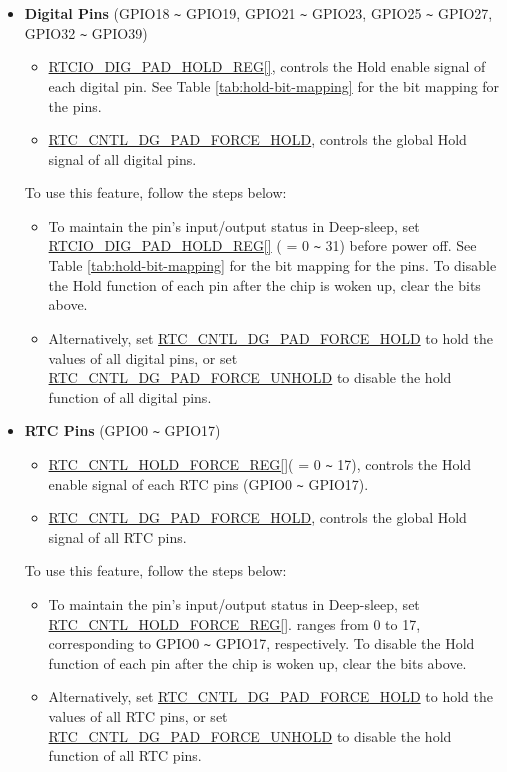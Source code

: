 \documentclass[main\_\_EN.tex]{subfiles}
\begin{document}
\begin{itemize}
    \item \textbf{Digital Pins} (GPIO18 \verb+~+ GPIO19, GPIO21 \verb+~+ GPIO23, GPIO25 \verb+~+ GPIO27, GPIO32 \verb+~+ GPIO39)
    \begin{itemize}
        \item \hyperref[regdesc:RTCIODIGPADHOLDREG] {RTCIO\_DIG\_PAD\_HOLD\_REG[]}, controls the Hold enable signal of each digital pin. See Table \ref{tab:hold-bit-mapping} for the bit mapping for the pins.
        \item \hyperref[regdesc:RTCCNTLDIGISOREG]{RTC\_CNTL\_DG\_PAD\_FORCE\_HOLD}, controls the global Hold signal of all digital pins.
    \end{itemize}
To use this feature, follow the steps below:
    \begin{itemize}
        \item To maintain the pin's input/output status in Deep-sleep, set \hyperref[regdesc:RTCIODIGPADHOLDREG] {RTCIO\_DIG\_PAD\_HOLD\_REG[]} ( = 0 \verb+~+ 31) before power off. See Table \ref{tab:hold-bit-mapping} for the bit mapping for the pins. To disable the Hold function of each pin after the chip is woken up, clear the bits above.
        \item Alternatively, set \hyperref[regdesc:RTCCNTLDIGISOREG]{RTC\_CNTL\_DG\_PAD\_FORCE\_HOLD} to hold the values of all digital pins, or set \hyperref[regdesc:RTCCNTLDIGISOREG]{RTC\_CNTL\_DG\_PAD\_FORCE\_UNHOLD} to disable the hold function of all digital pins.
    \end{itemize}
    \item \textbf{RTC Pins} (GPIO0 \verb+~+ GPIO17)
    \begin{itemize}
        \item \hyperref[regdesc:RTCCNTLHOLDFORCEREG]{RTC\_CNTL\_HOLD\_FORCE\_REG[]}( = 0 \verb+~+ 17), controls the Hold enable signal of each RTC pins (GPIO0 \verb+~+ GPIO17).
        \item \hyperref[regdesc:RTCCNTLDIGISOREG]{RTC\_CNTL\_DG\_PAD\_FORCE\_HOLD}, controls the global Hold signal of all RTC pins.
    \end{itemize}
    
To use this feature, follow the steps below:

    \begin{itemize}
        \item To maintain the pin's input/output status in Deep-sleep, set \hyperref[regdesc:RTCCNTLHOLDFORCEREG]{RTC\_CNTL\_HOLD\_FORCE\_REG[]}.  ranges from 0 to 17, corresponding to GPIO0 \verb+~+ GPIO17, respectively. To disable the Hold function of each pin after the chip is woken up, clear the bits above.
        \item Alternatively, set \hyperref[regdesc:RTCCNTLDIGISOREG]{RTC\_CNTL\_DG\_PAD\_FORCE\_HOLD} to hold the values of all RTC pins, or set \hyperref[regdesc:RTCCNTLDIGISOREG]{RTC\_CNTL\_DG\_PAD\_FORCE\_UNHOLD} to disable the hold function of all RTC pins.
    \end{itemize}
\end{itemize}
\end{document}
